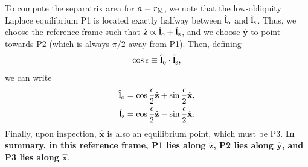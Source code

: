 \documentclass[11pt,
        usenames, %
        dvipsnames %
    ]{article}
\newcommand*{\bm}[1]{\boldsymbol{\mathbf{#1}}}
\newcommand*{\uv}[1]{\hat{\bm{#1}}}
\begin{document}
To compute the separatrix area for $a = r_{\rm M}$, we note that the
low-obliquity Laplace equilibrium P1 is located exactly halfway between
$\uv{l}_{\rm o}$ and $\uv{l}_{\rm s}$. Thus, we choose the reference frame such
that $\uv{z}\propto \uv{l}_{\rm o} + \uv{l}_{\rm s}$, and we choose $\uv{y}$ to
point towards P2 (which is always $\pi/2$ away from P1). Then, defining
\begin{equation}
    \cos \epsilon \equiv \uv{l}_{\rm o} \cdot \uv{l}_{\rm s},
\end{equation}
we can write
\begin{align}
    \uv{l}_{\rm o} &= \cos \frac{\epsilon}{2} \uv{z} + \sin
        \frac{\epsilon}{2}\uv{x},\\
    \uv{l}_{\rm s} &= \cos \frac{\epsilon}{2} \uv{z} - \sin
        \frac{\epsilon}{2}\uv{x}.
\end{align}
Finally, upon inspection, $\uv{x}$ is also an equilibrium point, which must be
P3. \textbf{In summary, in this reference frame, P1 lies along $\uv{z}$, P2 lies
along $\uv{y}$, and P3 lies along $\uv{x}$}.
\end{document}
